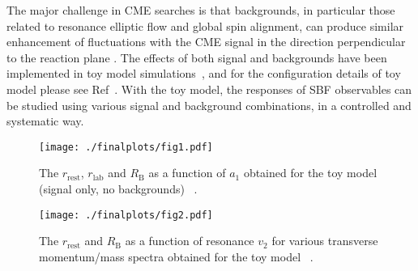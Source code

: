 \label{simulation}
 The major challenge in CME searches is that backgrounds, in particular those related to resonance elliptic flow and global spin alignment, can produce similar enhancement of fluctuations with the CME signal in the direction perpendicular to the reaction plane \cite{tang2019, ref4}. The effects of both signal and backgrounds have been implemented in toy model simulations~\cite{Tang2019}, and for the configuration details of toy model please see Ref~\cite{toymodel}. With the toy model, the responses of SBF observables can be studied  using various signal and background combinations, in a controlled and systematic way.
 
 

\begin{figure}[htbp!]
\vspace{-0.4cm}
\centering 
\begin{minipage}[b]{0.33\textwidth} 
\centering 
\texttt{[image: ./finalplots/fig1.pdf]}
\caption{ The $r_{\mathrm{rest}}$, $r_{\mathrm{lab}}$ and  $R_{\mathrm{B}}$  as a function of $a_{1}$ obtained for the toy model (signal only, no backgrounds) ~\cite{tang2019probe}. 
\vspace{3.4mm}
 }
\label{Fig.1}
\end{minipage}
\hspace{0.10cm}
\begin{minipage}[b]{0.33\textwidth} 
\centering 
\texttt{[image: ./finalplots/fig2.pdf]}
\caption{  The $r_{\mathrm{rest}}$ and $R_{\mathrm{B}}$ as a function of resonance $v_{2}$ for various transverse momentum/mass spectra obtained for the toy model ~\cite{tang2019probe}. }
\label{Fig.2}
\end{minipage}
\end{figure}



